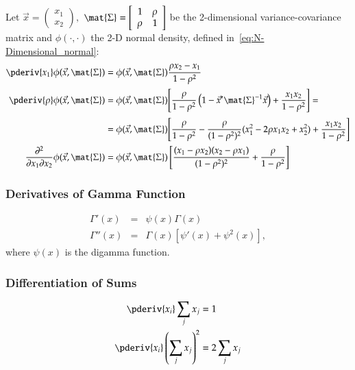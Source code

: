 \documentclass[a4paper]{article}
\numberwithin{equation}{subsection}
\begin{document}
Let 
\begin{math}
  \vec{x} = \left(
    \begin{array}{r}
      x_{1} \\ x_{2}
    \end{array}
  \right),
\end{math}
$\mat{\Sigma} = \left[
 \begin{array}{rr} 1 & \rho \\
 \rho & 1
\end{array}\right]$ be the 2-dimensional variance-covariance matrix
and $\phi(\cdot,\cdot)$ the 2-D normal density, defined
in~\eqref{eq:N-Dimensional_normal}:
\begin{align}
  \pderiv{x_{1}}
  \phi(\vec{x}, \mat{\Sigma})
  &=
  \phi(\vec{x}, \mat{\Sigma})
  \frac{\rho x_{2} - x_{1}}{1 - \rho^{2}}
  \\
  \pderiv{\rho}
  \phi(\vec{x}, \mat{\Sigma})
  &=
  \phi(\vec{x}, \mat{\Sigma})
  \Bigg[
  \frac{\rho}{1 - \rho^{2}}
  \left(
    1 - \vec{x}' \mat{\Sigma}^{-1} \vec{x}
  \right)
  +
  \frac{x_{1} x_{2}}{1 - \rho^{2}}
  \Bigg]
  =
  \notag\\
  &=
  \phi(\vec{x}, \mat{\Sigma})
  \Bigg[
  \frac{\rho}{1 - \rho^{2}}
  -
  \frac{\rho}{(1 - \rho^{2})^{2}}
  (x_{1}^{2} - 2 \rho x_{1} x_{2} + x_{2}^{2})
  +
  \frac{x_{1} x_{2}}{1 - \rho^{2}}
  \Bigg]
  \\
  \frac{\partial^{2}}{\partial x_{1} \partial x_{2}}
  \phi(\vec{x}, \mat{\Sigma})
  &=
  \phi(\vec{x}, \mat{\Sigma})
  \left[
    \frac{(x_{1} - \rho x_{2})(x_{2} - \rho x_{1})}
    {(1 - \rho^{2})^{2}}
    +
    \frac{\rho}{1 - \rho^{2}}
  \right]
\end{align}


\subsubsection{Derivatives of Gamma Function}
\begin{eqnarray}
\Gamma'(x) &=&
  \psi(x) \Gamma(x)\\
\Gamma''(x) &=&
  \Gamma(x) \left[ \psi'(x) + \psi^2(x) \right],
\end{eqnarray}
where $\psi(x)$ is the digamma function.


\subsubsection{Differentiation of Sums}
\begin{align}
  \pderiv{x_{i}}\sum_{j} x_{j} &= 1
  \\
  \pderiv{x_{i}} 
  \left( \sum_{j} x_{j} \right)^{2}
  &= 2 \sum_{j} x_{j}
\end{align}
\end{document}

